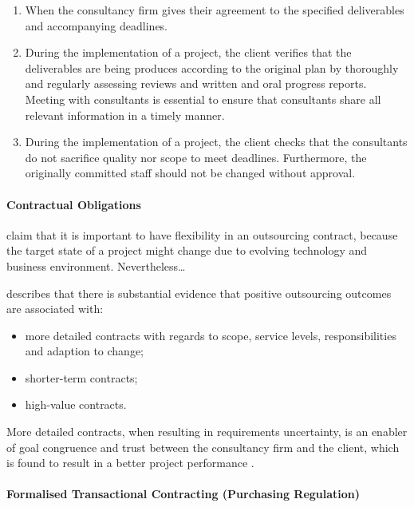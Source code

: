 \documentclass[12pt]{article}
\providecommand{\tightlist}{%
  \setlength{\itemsep}{0pt}\setlength{\parskip}{0pt}}
\begin{document}
\begin{enumerate}
\def\labelenumi{\arabic{enumi}.}
\tightlist
\item
  When the consultancy firm gives their agreement to the specified
  deliverables and accompanying deadlines.
\item
  During the implementation of a project, the client verifies that the
  deliverables are being produces according to the original plan by
  thoroughly and regularly assessing reviews and written and oral
  progress reports. Meeting with consultants is essential to ensure that
  consultants share all relevant information in a timely manner.
\item
  During the implementation of a project, the client checks that the
  consultants do not sacrifice quality nor scope to meet deadlines.
  Furthermore, the originally committed staff should not be changed
  without approval.
\end{enumerate}

\hypertarget{contractual-obligations}{%
\paragraph{Contractual Obligations}\label{contractual-obligations}}

\citet{mcfarlan1995} claim that it is important to have flexibility in
an outsourcing contract, because the target state of a project might
change due to evolving technology and business environment.
Nevertheless\ldots{}

\citet[4]{lacity2012} describes that there is substantial evidence that
positive outsourcing outcomes are associated with:

\begin{itemize}
\tightlist
\item
  more detailed contracts with regards to scope, service levels,
  responsibilities and adaption to change;
\item
  shorter-term contracts;
\item
  high-value contracts.
\end{itemize}

More detailed contracts, when resulting in requirements uncertainty, is
an enabler of goal congruence and trust between the consultancy firm and
the client, which is found to result in a better project performance
\citep{liberatore264}.

\hypertarget{formalised-transactional-contracting-purchasing-regulation}{%
\paragraph{Formalised Transactional Contracting (Purchasing
Regulation)}\label{formalised-transactional-contracting-purchasing-regulation}}
\end{document}
